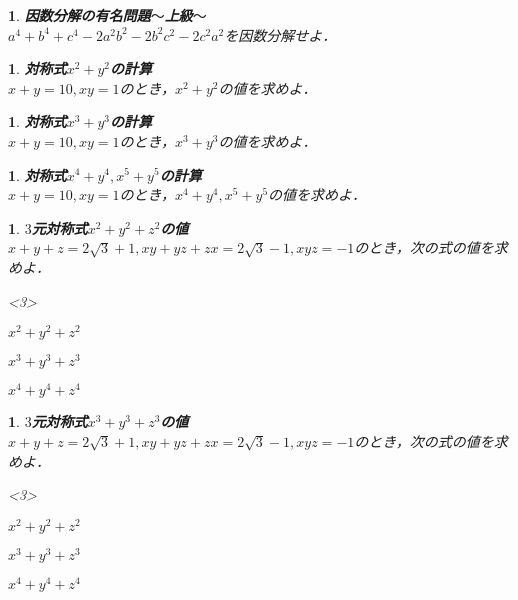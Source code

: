 \documentclass[10pt,
fleqn,
dvipdfmx,
uplatex
]{jsarticle}
\newtheorem{question}[Question]{}
\begin{document}
\begin{question}{\bf\boldmath 因数分解の有名問題$〜$上級$〜$}\\
$a^4+b^4+c^4-2a^2b^2-2b^2c^2-2c^2a^2$を因数分解せよ．
\end{question}



\begin{question}{\bf\boldmath 対称式$x^2+y^2$の計算}\\
$x+y={10}, xy=1$のとき，$x^2+y^2$の値を求めよ．
\end{question}



\begin{question}{\bf\boldmath 対称式$x^3+y^3$の計算}\\
$x+y={10}, xy=1$のとき，$x^3+y^3$の値を求めよ．
\end{question}



\begin{question}{\bf\boldmath 対称式$x^4+y^4,x^5+y^5$の計算}\\
$x+y={10}, xy=1$のとき，$x^4+y^4, x^5+y^5$の値を求めよ．
\end{question}



\begin{question}{\bf\boldmath $3$元対称式$x^2+y^2+z^2$の値}\\
$x+y+z=2\sqrt 3+1, xy+yz+zx=2\sqrt 3-1, xyz=-1$のとき，次の式の値を求めよ．
\begin{edaenumerate}<3>
\item $x^2+y^2+z^2$
\item $x^3+y^3+z^3$
\item $x^4+y^4+z^4$
\end{edaenumerate}

\end{question}



\begin{question}{\bf\boldmath $3$元対称式$x^3+y^3+z^3$の値}\\
$x+y+z=2\sqrt 3+1, xy+yz+zx=2\sqrt 3-1, xyz=-1$のとき，次の式の値を求めよ．
\begin{edaenumerate}<3>
\item $x^2+y^2+z^2$
\item $x^3+y^3+z^3$
\item $x^4+y^4+z^4$
\end{edaenumerate}

\end{question}
\end{document}
